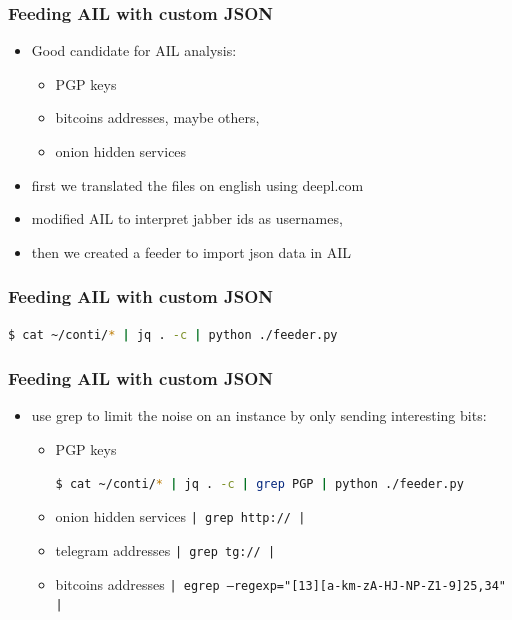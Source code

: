 \begin{frame}[fragile]                                                                                                                        

   \frametitle{Feeding AIL with custom JSON}

        \begin{itemize}
		\item Good candidate for AIL analysis:
        	\begin{itemize}
			\item PGP keys
			\item bitcoins addresses, maybe others,
			\item onion hidden services
        	\end{itemize}
                \item first we translated the files on english using deepl.com 
		\item modified AIL to interpret jabber ids as usernames,
		\item then we created a feeder to import json data in AIL
        \end{itemize}

\end{frame}


\begin{frame}[fragile]                                                                                                                        
   \frametitle{Feeding AIL with custom JSON}
	

	\begin{lstlisting}[language=bash]
	$ cat ~/conti/* | jq . -c | python ./feeder.py
	\end{lstlisting}

\end{frame}

\begin{frame}[fragile]                                                                                                                        

   \frametitle{Feeding AIL with custom JSON}

        \begin{itemize}
		\item use grep to limit the noise on an instance by only sending interesting bits:
        	\begin{itemize}
			\item PGP keys
	\begin{lstlisting}[language=bash]
	$ cat ~/conti/* | jq . -c | grep PGP | python ./feeder.py
	\end{lstlisting}
			\item onion hidden services \texttt{| grep http:// |}
			\item telegram addresses \texttt{| grep tg:// | }
			\item bitcoins addresses \texttt{| egrep --regexp="[13][a-km-zA-HJ-NP-Z1-9]{25,34}" | }

        	\end{itemize}
        \end{itemize}

\end{frame}
